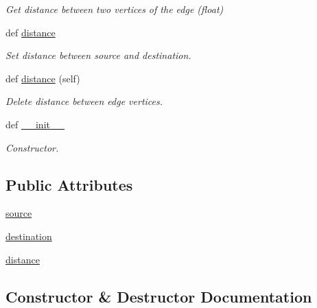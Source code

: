 \begin{DoxyCompactItemize}
\begin{DoxyCompactList}\small\item\em Get distance between two vertices of the edge (float) \end{DoxyCompactList}\item 
def \hyperlink{classbridges_1_1data__src__dependent_1_1osm_1_1_osm_edge_aa3931845de062f70bae375a389a9262d}{distance}
\begin{DoxyCompactList}\small\item\em Set distance between source and destination. \end{DoxyCompactList}\item 
def \hyperlink{classbridges_1_1data__src__dependent_1_1osm_1_1_osm_edge_ae20fb44608780d4f10f55c1a85e4d410}{distance} (self)
\begin{DoxyCompactList}\small\item\em Delete distance between edge vertices. \end{DoxyCompactList}\item 
def \hyperlink{classbridges_1_1data__src__dependent_1_1osm_1_1_osm_edge_ac0f57be58220744c49bffc353d73db6f}{\+\_\+\+\_\+init\+\_\+\+\_\+}
\begin{DoxyCompactList}\small\item\em Constructor. \end{DoxyCompactList}\end{DoxyCompactItemize}
\subsection*{Public Attributes}
\begin{DoxyCompactItemize}
\item 
\hyperlink{classbridges_1_1data__src__dependent_1_1osm_1_1_osm_edge_a968664892933e9784909282cc53b0315}{source}
\item 
\hyperlink{classbridges_1_1data__src__dependent_1_1osm_1_1_osm_edge_aa81426d41bd031b2fa3789173206c0dc}{destination}
\item 
\hyperlink{classbridges_1_1data__src__dependent_1_1osm_1_1_osm_edge_aed843c7fcb887bb11b609387fc3af35f}{distance}
\end{DoxyCompactItemize}


\subsection{Constructor \& Destructor Documentation}
\mbox{\label{classbridges_1_1data__src__dependent_1_1osm_1_1_osm_edge_ac0f57be58220744c49bffc353d73db6f}} 
